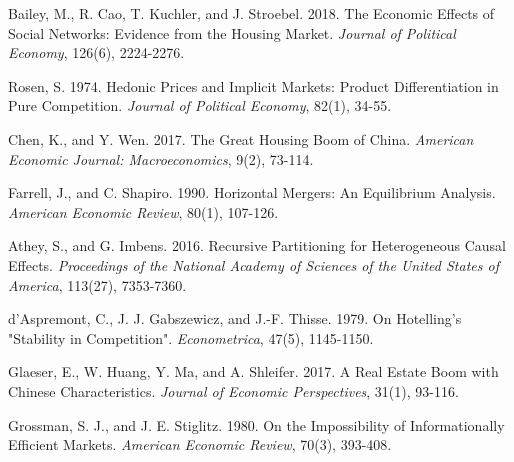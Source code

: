 \documentclass[11pt]{article}
\begin{document}

\clearpage
\begin{singlespace}
%
%
% 
% 

\begin{thebibliography}{}

  Bailey, M., R. Cao, T. Kuchler, and J. Stroebel. 2018. The Economic Effects of Social Networks: Evidence from the Housing Market. \textit{Journal of Political Economy}, 126(6), 2224-2276.
  
  Rosen, S. 1974. Hedonic Prices and Implicit Markets: Product Differentiation in Pure Competition. \textit{Journal of Political Economy}, 82(1), 34-55.%
  
  Chen, K., and Y. Wen. 2017. The Great Housing Boom of China. \textit{American Economic Journal: Macroeconomics}, 9(2), 73-114.
  
  Farrell, J., and C. Shapiro. 1990. Horizontal Mergers: An Equilibrium Analysis. \textit{American Economic Review}, 80(1), 107-126.
  
  Athey, S., and G. Imbens. 2016. Recursive Partitioning for Heterogeneous Causal Effects. \textit{Proceedings of the National Academy of Sciences of the United States of America}, 113(27), 7353-7360.
  
  d'Aspremont, C., J. J. Gabszewicz, and J.-F. Thisse. 1979. On Hotelling’s "Stability in Competition". \textit{Econometrica}, 47(5), 1145-1150.
  
  Glaeser, E., W. Huang, Y. Ma, and A. Shleifer. 2017. A Real Estate Boom with Chinese Characteristics. \textit{Journal of Economic Perspectives}, 31(1), 93-116.
  
  Grossman, S. J., and J. E. Stiglitz. 1980. On the Impossibility of Informationally Efficient Markets. \textit{American Economic Review}, 70(3), 393-408.
  

\end{thebibliography}
\end{singlespace}
\end{document}

